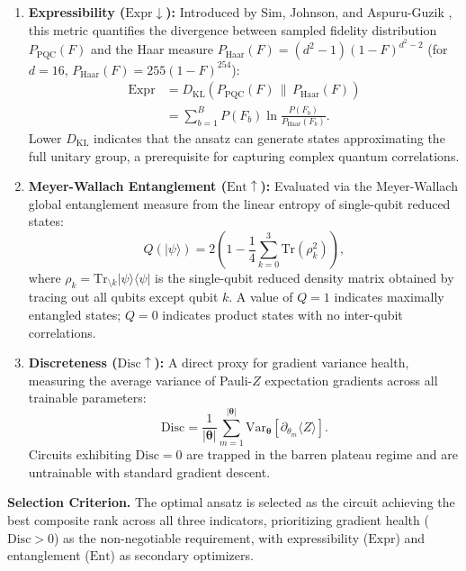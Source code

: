 \documentclass[journal]{IEEEtran}
\begin{document}
\begin{enumerate}
    \item \textbf{Expressibility ($\mathrm{Expr} \downarrow$):} Introduced by Sim, Johnson, and Aspuru-Guzik \cite{sim2019expressibility}, this metric quantifies the divergence between sampled fidelity distribution $P_{\mathrm{PQC}}(F)$ and the Haar measure $P_{\mathrm{Haar}}(F) = (d^2-1)(1-F)^{d^2-2}$ (for $d=16$, $P_{\mathrm{Haar}}(F) = 255(1-F)^{254}$):
    \begin{align}
    \mathrm{Expr} &= D_{\mathrm{KL}}\left( P_{\mathrm{PQC}}(F) \,\|\, P_{\mathrm{Haar}}(F) \right) \nonumber \\
    &= \sum_{b=1}^{B} P(F_b) \ln \frac{P(F_b)}{P_{\mathrm{Haar}}(F_b)}.
    \label{eq:expressibility_metric}
    \end{align}
    Lower $D_{\mathrm{KL}}$ indicates that the ansatz can generate states approximating the full unitary group, a prerequisite for capturing complex quantum correlations.
    \item \textbf{Meyer-Wallach Entanglement ($\mathrm{Ent} \uparrow$):} Evaluated via the Meyer-Wallach global entanglement measure \cite{meyer2002global} from the linear entropy of single-qubit reduced states:
    \begin{equation}
    Q(|\psi\rangle) = 2 \left( 1 - \frac{1}{4} \sum_{k=0}^{3} \mathrm{Tr}\left(\rho_k^2\right) \right),
    \label{eq:meyer_wallach}
    \end{equation}
    where $\rho_k = \mathrm{Tr}_{\setminus k} |\psi\rangle\langle\psi|$ is the single-qubit reduced density matrix obtained by tracing out all qubits except qubit $k$. A value of $Q = 1$ indicates maximally entangled states; $Q = 0$ indicates product states with no inter-qubit correlations.
    \item \textbf{Discreteness ($\mathrm{Disc} \uparrow$):} A direct proxy for gradient variance health, measuring the average variance of Pauli-$Z$ expectation gradients across all trainable parameters:
    \begin{equation}
    \mathrm{Disc} = \frac{1}{|\boldsymbol{\theta}|} \sum_{m=1}^{|\boldsymbol{\theta}|} \mathrm{Var}_{\boldsymbol{\theta}}[\partial_{\theta_m} \langle Z \rangle].
    \label{eq:discreteness_metric}
    \end{equation}
    Circuits exhibiting $\mathrm{Disc} = 0$ are trapped in the barren plateau regime and are untrainable with standard gradient descent.
\end{enumerate}

\textbf{Selection Criterion.} The optimal ansatz is selected as the circuit achieving the best composite rank across all three indicators, prioritizing gradient health ($\mathrm{Disc} > 0$) as the non-negotiable requirement, with expressibility ($\mathrm{Expr}$) and entanglement ($\mathrm{Ent}$) as secondary optimizers.
\end{document}
